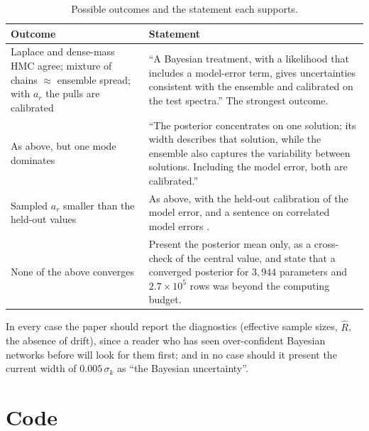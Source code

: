 \begin{table}[h]
\centering
\small
\begin{tabular}{p{}p{}}
\toprule
Outcome & Statement \\
\midrule
Laplace and dense-mass HMC agree; mixture of chains $\approx$ ensemble spread; with $a_r$
the pulls are calibrated &
``A Bayesian treatment, with a likelihood that includes a model-error term, gives
uncertainties consistent with the ensemble and calibrated on the test spectra.'' The
strongest outcome. \\
\addlinespace
As above, but one mode dominates &
``The posterior concentrates on one solution; its width describes that solution, while the
ensemble also captures the variability between solutions. Including the model error, both
are calibrated.'' \\
\addlinespace
Sampled $a_r$ smaller than the held-out values &
As above, with the held-out calibration of the model error, and a sentence on correlated
model errors \cite{Kennedy:2001}. \\
\addlinespace
None of the above converges &
Present the posterior mean only, as a cross-check of the central value, and state that a
converged posterior for $3{,}944$ parameters and $2.7\times10^5$ rows was beyond the
computing budget. \\
\bottomrule
\end{tabular}
\caption{Possible outcomes and the statement each supports.}
\end{table}

In every case the paper should report the diagnostics (effective sample sizes, $\hat R$,
the absence of drift), since a reader who has seen over-confident Bayesian networks before
will look for them first; and in no case should it present the current width of
$0.005\,\sigma_k$ as ``the Bayesian uncertainty''.

\section{Code}
\label{sec:code}

